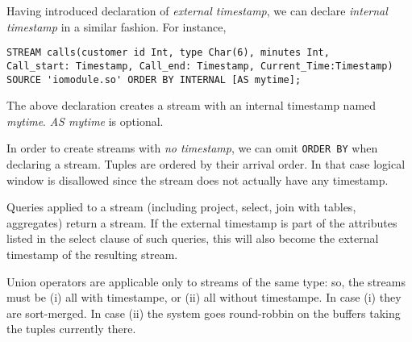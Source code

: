 \documentclass[10pt]{report}
\begin{document}
Having introduced declaration of {\em external timestamp}, we can declare {\em internal timestamp} in a similar fashion.  For instance, 
\begin{verbatim}
STREAM calls(customer id Int, type Char(6), minutes Int,
Call_start: Timestamp, Call_end: Timestamp, Current_Time:Timestamp)
SOURCE 'iomodule.so' ORDER BY INTERNAL [AS mytime];
\end{verbatim}
The above declaration creates a stream with an internal timestamp named {\em mytime}.  {\em AS mytime} is optional.


In order to create streams with {\em no timestamp}, we can omit {\tt ORDER BY} when declaring a stream. Tuples are ordered by their arrival order.  In that case logical window is disallowed since the stream does not actually have any timestamp.



Queries  applied to a stream (including project, select, join
with tables, aggregates) return a stream. If the external timestamp
is part of the attributes listed in the select clause of such
queries, this will  also become the external timestamp of the resulting stream.

Union operators are applicable only to streams of the same type:
so,  the streams must be (i) all with timestampe, or (ii)
all without timestampe. In case (i) they are sort-merged. In
case (ii) the system goes round-robbin on the buffers taking the
tuples currently there.
\end{document}

